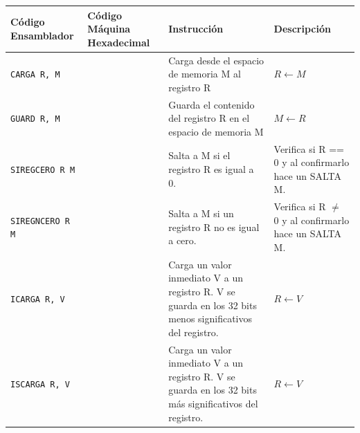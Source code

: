 \documentclass{article}
\begin{document}
\begin{longtable}{|p{}|p{}|p{}|p{}|}
  \hline
  \textbf{Código Ensamblador} & \textbf{Código Máquina Hexadecimal} & \textbf{Instrucción}                                               & \textbf{Descripción}                       \\
  \hline
  \texttt{CARGA R, M}  &  & Carga desde el espacio de memoria M al registro R                                                                                                                                             & $R \leftarrow M$                                                                                                    \\
  \hline
  \texttt{GUARD R, M}  &  & Guarda el contenido del registro R en el espacio de memoria M                                                                                                                                 & $M \leftarrow R$                                                                                                    \\
  \hline
  \texttt{SIREGCERO R M}   &  & Salta a M si el registro R es igual a 0.                                                                                                                                                    & Verifica si R == 0 y al confirmarlo hace un SALTA M.                                                                   \\
  \hline
  \texttt{SIREGNCERO R M}  &  & Salta a M si un registro R no es igual a cero.                                                                                                                                              & Verifica si R $\neq$ 0 y al confirmarlo hace un SALTA M.                                                                    \\
  \hline
  \texttt{ICARGA R, V} &  & Carga un valor inmediato V a un registro R. V se guarda en los 32 bits menos significativos del registro.                                                                                     & $R \leftarrow V$                                                                                                    \\
  \hline
  \texttt{ISCARGA R, V}&  & Carga un valor inmediato V a un registro R.  V se guarda en los 32 bits más significativos del registro.                                                                                      & $R \leftarrow V$                                                                                                    \\

\end{longtable}
\end{document}
